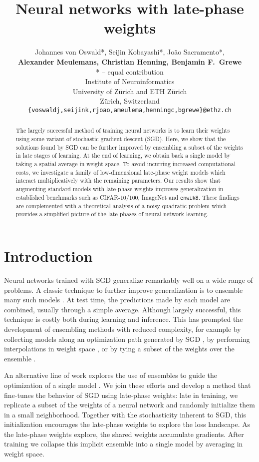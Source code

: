 \documentclass{article} \usepackage{iclr2021_conference,times}
\title{Neural networks with late-phase weights}
\author{Johannes von Oswald*, Seijin Kobayashi*, João Sacramento*,\\
\textbf{Alexander Meulemans, Christian Henning, Benjamin F.~Grewe}\\
\vspace{0.5cm}
* -- equal contribution\\
Institute of Neuroinformatics\\
University of Zürich and ETH Zürich\\
Zürich, Switzerland\\
\texttt{\{voswaldj,seijink,rjoao,ameulema,henningc,bgrewe\}@ethz.ch}}
\begin{document}
\maketitle

\begin{abstract}
The largely successful method of training neural networks is to learn their weights using some variant of stochastic gradient descent (SGD). Here, we show that the solutions found by SGD can be further improved by ensembling a subset of the weights in late stages of learning. At the end of learning, we obtain back a single model by taking a spatial average in weight space. To avoid incurring increased computational costs, we investigate a family of low-dimensional late-phase weight models which interact multiplicatively with the remaining parameters. Our results show that augmenting standard models with late-phase weights improves generalization in established benchmarks such as CIFAR-10/100, ImageNet and \texttt{enwik8}. These findings are complemented with a theoretical analysis of a noisy quadratic problem which provides a simplified picture of the late phases of neural network learning.
\end{abstract}

\section{Introduction}

Neural networks trained with SGD generalize remarkably well on a wide range of problems. A classic technique to further improve generalization is to ensemble many such models \citep{lakshminarayanan_simple_2017}. At test time, the predictions made by each model are combined, usually through a simple average. Although largely successful, this technique is costly both during learning and inference. This has prompted the development of ensembling methods with reduced complexity, for example by collecting models along an optimization path generated by SGD \citep{huang_snapshot_2017}, by performing interpolations in weight space \citep{garipov_loss_2018}, or by tying a subset of the weights over the ensemble \citep{lee_why_2015,wen_batchensemble_2020}.

An alternative line of work explores the use of ensembles to guide the optimization of a single model \citep{zhang_deep_2015,pittorino_entropic_2020}. We join these efforts and develop a method that fine-tunes the behavior of SGD using late-phase weights: late in training, we replicate a subset of the weights of a neural network and randomly initialize them in a small neighborhood. Together with the stochasticity inherent to SGD, this initialization encourages the late-phase weights to explore the loss landscape. As the late-phase weights explore, the shared weights accumulate gradients. After training we collapse this implicit ensemble into a single model by averaging in weight space.
\end{document}
